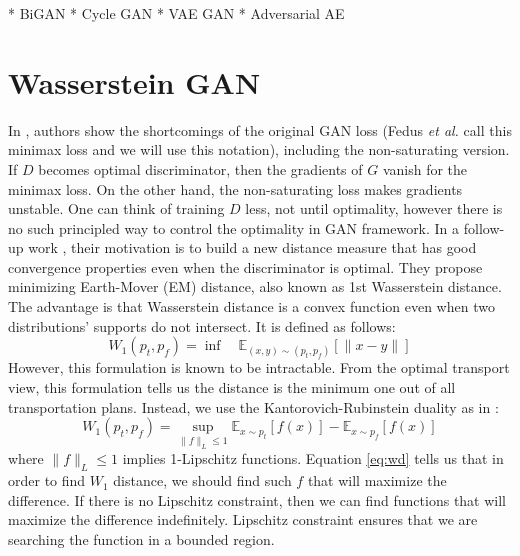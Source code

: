 \documentclass[a4paper,onesided,12pt]{report}
\begin{document}
* BiGAN
* Cycle GAN
* VAE GAN
* Adversarial AE


\section{Wasserstein GAN}
\label{sec:wgan}
In \cite{arjovsky2017towards}, authors show the shortcomings of the original GAN loss (Fedus \textit{et al.} \cite{fedus2017many} call this minimax loss and we will use this notation), including the non-saturating version. If $D$ becomes optimal discriminator, then the gradients of $G$ vanish for the minimax loss. On the other hand, the non-saturating loss makes gradients unstable. One can think of training $D$ less, not until optimality, however there is no such principled way to control the optimality in GAN framework. In a follow-up work \cite{arjovsky2017wasserstein}, their motivation is to build a new distance measure that has good convergence properties even when the discriminator is optimal. They propose minimizing Earth-Mover (EM) distance, also known as 1st Wasserstein distance. The advantage is that Wasserstein distance is a convex function even when two distributions' supports do not intersect. It is defined as follows:
\begin{equation}
W_1(p_t, p_f) = \inf \quad \mathbb{E}_{(x,y) \sim (p_t, p_f)} [ \| x-y \| ]
\label{eq:emd}
\end{equation}
However, this formulation is known to be intractable. From the optimal transport view, this formulation tells us the distance is the minimum one out of all transportation plans. Instead, we use the Kantorovich-Rubinstein duality as in \cite{arjovsky2017wasserstein}:
\begin{equation}
W_1(p_t, p_f) = \underset{\|f\|_L \leq 1}{\sup} \mathbb{E}_{x\sim p_t} [f(x)] - \mathbb{E}_{x \sim p_f} [f(x)]
\label{eq:wd}
\end{equation}
where $\|f\|_L \leq 1$ implies 1-Lipschitz functions. Equation \ref{eq:wd} tells us that in order to find $W_1$ distance, we should find such $f$ that will maximize the difference. If there is no Lipschitz constraint, then we can find functions that will maximize the difference indefinitely. Lipschitz constraint ensures that we are searching the function in a bounded region.
\end{document}
